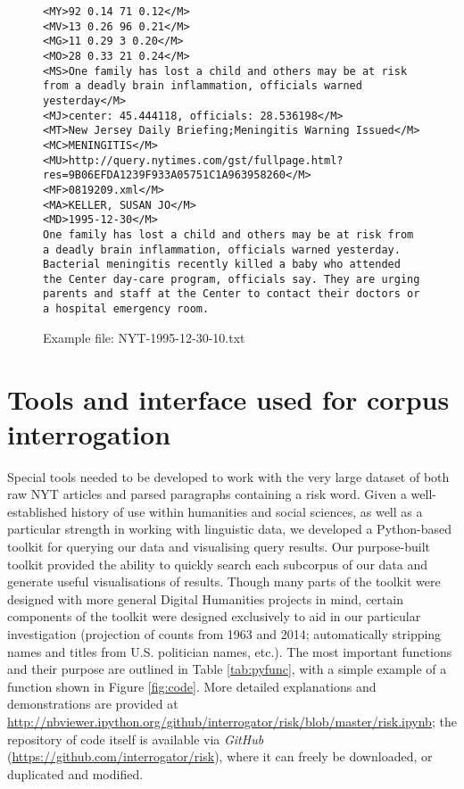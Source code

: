 \begin{figure}
\footnotesize
\begin{lstlisting}[breaklines]
<MY>92 0.14 71 0.12</M>
<MV>13 0.26 96 0.21</M>
<MG>11 0.29 3 0.20</M>
<MO>28 0.33 21 0.24</M>
<MS>One family has lost a child and others may be at risk from a deadly brain inflammation, officials warned yesterday</M>
<MJ>center: 45.444118, officials: 28.536198</M>
<MT>New Jersey Daily Briefing;Meningitis Warning Issued</M>
<MC>MENINGITIS</M>
<MU>http://query.nytimes.com/gst/fullpage.html?res=9B06EFDA1239F933A05751C1A963958260</M>
<MF>0819209.xml</M>
<MA>KELLER, SUSAN JO</M>
<MD>1995-12-30</M>
One family has lost a child and others may be at risk from a deadly brain inflammation, officials warned yesterday. Bacterial meningitis recently killed a baby who attended the Center day-care program, officials say. They are urging parents and staff at the Center to contact their doctors or a hospital emergency room.
\end{lstlisting}
\caption{Example file: NYT-1995-12-30-10.txt}
\label{fig:exfile}
\end{figure}

\section{Tools and interface used for corpus interrogation}

Special tools needed to be developed to work with the very large dataset of both raw NYT articles and parsed paragraphs containing a risk word. Given a well-established history of use within humanities and social sciences, as well as a particular strength in working with linguistic data, we developed a Python-based toolkit for querying our data and visualising query results. Our purpose-built toolkit provided the ability to quickly search each subcorpus of our data and generate useful visualisations of results. Though many parts of the toolkit were designed with more general Digital Humanities projects in mind, certain components of the toolkit were designed exclusively to aid in our particular investigation (projection of counts from 1963 and 2014; automatically stripping names and titles from U.S. politician names, etc.). The most important functions and their purpose are outlined in Table \ref{tab:pyfunc}, with a simple example of a function shown in Figure \ref{fig:code}. More detailed explanations and demonstrations are provided at \url{http://nbviewer.ipython.org/github/interrogator/risk/blob/master/risk.ipynb}; the repository of code itself is available via \emph{GitHub} (\url{https://github.com/interrogator/risk}), where it can freely be downloaded, or duplicated and modified.

